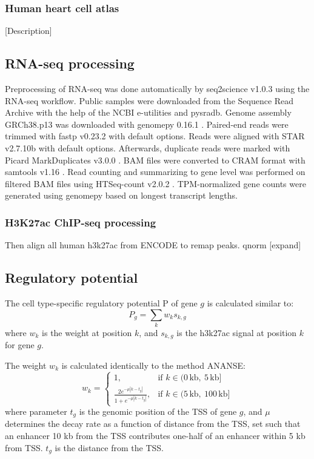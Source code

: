 \subsubsection{Human heart cell atlas}

[Description]

\subsection{RNA-seq processing}

Preprocessing of RNA-seq was done automatically by seq2science v1.0.3 \cite{seq2science} using the RNA-seq workflow. Public samples were downloaded from the Sequence Read Archive \cite{Leinonen2010} with the help of the NCBI e-utilities and pysradb\cite{Choudhary2019}. Genome assembly GRCh38.p13 was downloaded with genomepy 0.16.1 \cite{Frlich2023}. Paired-end reads were trimmed with fastp v0.23.2 \cite{Chen2018} with default options. Reads were aligned with STAR v2.7.10b \cite{Dobin2012} with default options. Afterwards, duplicate reads were marked with Picard MarkDuplicates v3.0.0 \cite{picard}. BAM files were converted to CRAM format with samtools v1.16 \cite{Danecek2021}. Read counting and summarizing to gene level was performed on filtered BAM files using HTSeq-count v2.0.2 \cite{Anders2014}. TPM-normalized gene counts were generated using genomepy based on longest transcript lengths.

\subsubsection{H3K27ac ChIP-seq processing}

Then align all human h3k27ac from ENCODE to remap peaks. qnorm \cite{qnorm}
[expand]

\subsection{Regulatory potential}\label{section:regpotential}

The cell type-specific regulatory potential P of gene $g$ is calculated similar to\cite{Wang2016}:
\begin{equation*}
    P_g = \sum_k w_{k}s_{k,g}
\end{equation*}
where $w_k$ is the weight at position $k$, and $s_{k,g}$ is the h3k27ac signal at position $k$ for gene $g$.

\noindent
The weight $w_k$ is calculated identically to the method ANANSE\cite{Xu_2020}:
\begin{equation*}
    w_k = \begin{cases}
        1, & \text{if } k \in (0\,\text{kb},\ 5\,\text{kb}] \\
        \frac{2e^{-\mu|k-t_g|}}{1+e^{-\mu|k-t_g|}}, & \text{if } k \in (5\,\text{kb},\ 100\,\text{kb}]
    \end{cases}
\end{equation*}
where parameter $t_g$ is the genomic position of the TSS of gene $g$, and $\mu$ determines the decay rate as a function of distance from the TSS, set such that an enhancer 10 kb from the TSS contributes one-half of an enhancer within 5 kb from TSS. $t_g$ is the distance from the TSS.

